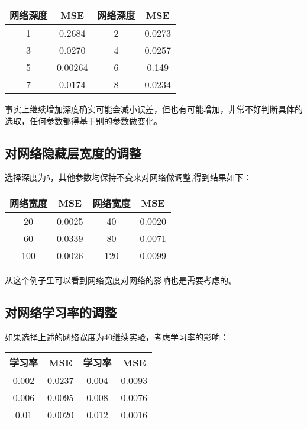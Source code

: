 \documentclass{article}
\begin{document}
	
		\begin{center}
		\centering%
		\begin{tabular}{cc|cc}%
			\toprule%
		网络深度&MSE & 网络深度 & MSE\\
			\midrule%
			1 &  0.2684 & 2 & 0.0273 \\
			3 &  0.0270 & 4 & 0.0257 \\
			5 & 0.00264 & 6 & 0.149 \\
			7 & 0.0174 & 8 & 0.0234 \\
			\bottomrule%
		\end{tabular}
	\end{center}

事实上继续增加深度确实可能会减小误差，但也有可能增加，非常不好判断具体的选取，任何参数都得基于别的参数做变化。

\subsection{对网络隐藏层宽度的调整}

选择深度为5，其他参数均保持不变来对网络做调整,得到结果如下：

	\begin{center}
	\begin{tabular}{cc|cc}%
		\toprule%
		网络宽度&MSE & 网络宽度 & MSE\\
		\midrule%
		20 & 0.0025  & 40 &  0.0020\\
		60 &  0.0339 & 80 & 0.0071 \\
		100 & 0.0026 & 120 & 0.0099 \\
		\bottomrule%
	\end{tabular}
\end{center}
	从这个例子里可以看到网络宽度对网络的影响也是需要考虑的。
	
	\subsection{对网络学习率的调整}
	如果选择上述的网络宽度为40继续实验，考虑学习率的影响：
		\begin{center}
		\begin{tabular}{cc|cc}%
			\toprule%
			学习率 & MSE & 学习率 & MSE\\
			\midrule%
			0.002 & 0.0237  & 0.004 & 0.0093\\
			0.006 &  0.0095 & 0.008 & 0.0076 \\
			0.01 & 0.0020 & 0.012 & 0.0016 \\
			\bottomrule%
		\end{tabular}
	\end{center}
\end{document}
